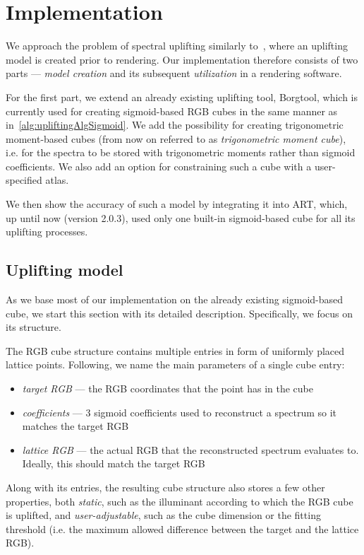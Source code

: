 \chapter{Implementation} \label{chap:implementation}

We approach the problem of spectral uplifting similarly to~\citet{upsamplingJakobHanika}, where an uplifting model is created prior to rendering. Our implementation therefore consists of two parts --- \emph{model creation} and its subsequent \emph{utilization} in a rendering software. 

For the first part, we extend an already existing uplifting tool, Borgtool, which is currently used for creating sigmoid-based RGB cubes in the same manner as in~\cref{alg:upliftingAlgSigmoid}. We add the possibility for creating trigonometric moment-based cubes (from now on referred to as \emph{trigonometric moment cube}), i.e. for the spectra to be stored with trigonometric moments rather than sigmoid coefficients. We also add an option for constraining such a cube with a user-specified atlas.

We then show the accuracy of such a model by integrating it into ART, which, up until now (version 2.0.3), used only one built-in sigmoid-based cube for all its uplifting processes.

\section{Uplifting model}

As we base most of our implementation on the already existing sigmoid-based cube, we start this section with its detailed description. Specifically, we focus on its structure.

The RGB cube structure contains multiple entries in form of uniformly placed lattice points. Following, we name the main parameters of a single cube entry:
\begin{itemize}
	\item \emph{target RGB} --- the RGB coordinates that the point has in the cube
	\item \emph{coefficients} --- 3 sigmoid coefficients used to reconstruct a spectrum so it matches the target RGB
	\item \emph{lattice RGB} --- the actual RGB that the reconstructed spectrum evaluates to. Ideally, this should match the target RGB
\end{itemize}
Along with its entries, the resulting cube structure also stores a few other properties, both \emph{static}, such as the illuminant according to which the RGB cube is uplifted, and \emph{user-adjustable}, such as the cube dimension or the fitting threshold (i.e. the maximum allowed difference between the target and the lattice RGB).

